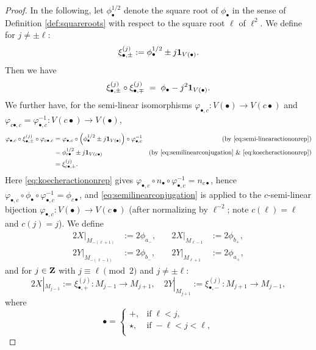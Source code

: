 \documentclass[a4paper,12pt,reqno]{amsart}
\newcommand{\ZZ}{{\rm\bf Z}}
\theoremstyle{plain}
\theoremstyle{remark}
\begin{document}
\begin{proof}
    In the following, let $\phi_\bullet^{1/2}$ denote the square root of $\phi_\bullet$ in the sense of Definition \ref{def:squareroots} with respect to the square root $\ell$ of $\ell^2$. We define for $j\neq\pm\ell$:
    \[
    \xi_{\bullet,\pm}^{(j)}:=\phi_\bullet^{1/2}\pm j{\bf1}_{V(\bullet)}.
    \]
    Then we have
    \begin{equation}
      \xi_{\bullet,\pm}^{(j)}\circ\xi_{\bullet,\mp}^{(j)}
      \;=\;
      \phi_\bullet-j^2{\bf1}_{V(\bullet)}.
    \end{equation}
    We further have, for the semi-linear isomorphisms $\varphi_{\bullet,c}\colon V(\bullet)\to V(c\bullet)$ and $\varphi_{c\bullet,c}=\varphi_{\bullet,c}^{-1}\colon V(c\bullet)\to V(\bullet)$,
    \begin{align*}
      \varphi_{\bullet,c}\circ
      \xi_{\bullet,\pm}^{(j)}
      \circ\varphi_{c\bullet,c}
      &=
      \varphi_{\bullet,c}\circ\left(\phi_\bullet^{1/2}\pm j{\bf1}_{V(\bullet)}\right)\circ\varphi_{\bullet,c}^{-1}
      &\text{(by \eqref{eq:semi-linearactiononrep})}\\
      &=
      \phi_{c\bullet}^{1/2}\pm j{\bf1}_{V(c\bullet)}
      &\text{(by \eqref{eq:semilinearconjugation} \& \eqref{eq:koecheractiononrep})}\\
      &=
      \xi_{c\bullet,\pm}^{(j)}.
    \end{align*}
    Here \eqref{eq:koecheractiononrep} gives $\varphi_{\bullet,c}\circ n_\bullet\circ\varphi_{\bullet,c}^{-1}=n_{c\bullet}$, hence $\varphi_{\bullet,c}\circ\phi_\bullet\circ\varphi_{\bullet,c}^{-1}=\phi_{c\bullet}$, and \eqref{eq:semilinearconjugation} is applied to the $c$-semi-linear bijection $\varphi_{\bullet,c}\colon V(\bullet)\to V(c\bullet)$ (after normalizing by $\ell^{-2}$; note $c(\ell)=\ell$ and $c(j)=j$).
    We define
    \begin{align*}
      2X|_{M_{-(\ell+1)}}&:=2\phi_{a_-},\quad&
      2X|_{M_{\ell-1}}&:=2\phi_{b_+},\\
      2Y|_{M_{-(\ell-1)}}&:=2\phi_{b_-},\quad&
      2Y|_{M_{\ell+1}}&:=2\phi_{a_+},
    \end{align*}
    and for $j\in\ZZ$ with $j\equiv\ell\pmod{2}$ and $j\neq\pm\ell$:
    \[
    2X|_{M_{j-1}}:=\xi_{\bullet,+}^{(j)}\colon M_{j-1}\to M_{j+1},
    \quad
    2Y|_{M_{j+1}}:=\xi_{\bullet,-}^{(j)}\colon M_{j+1}\to M_{j-1},
    \]
    where
    \[
    \bullet=
    \begin{cases}
      +,&\text{if}\;\ell<j,\\
      \star,&\text{if}\;-\ell<j<\ell,\\

\end{cases}\]
\end{proof}
\end{document}
